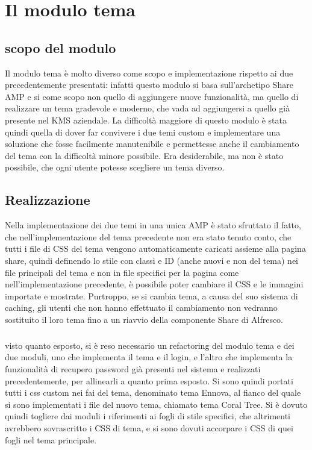 
\chapter{Il modulo tema}
\label{cap:modulo-tema}

\section{scopo del modulo}
Il modulo tema è molto diverso come scopo e implementazione rispetto ai due precedentemente presentati: infatti questo modulo si basa sull'archetipo Share AMP e si come scopo non quello di aggiungere nuove funzionalità, ma quello di realizzare un tema gradevole e moderno, che vada ad aggiungersi a quello già presente nel KMS aziendale. La difficoltà maggiore di questo modulo è stata quindi quella di dover far convivere i due temi custom e implementare una soluzione che fosse facilmente manutenibile e permettesse anche il cambiamento del tema con la difficoltà minore possibile.
Era desiderabile, ma non è stato possibile, che ogni utente potesse scegliere un tema diverso.
\section{Realizzazione}
Nella implementazione dei due temi in una unica AMP è stato sfruttato il fatto, che nell'implementazione del tema precedente non era stato tenuto conto, che tutti i file di CSS del tema vengono automaticamente caricati assieme alla pagina share, quindi definendo lo stile con classi e ID (anche nuovi e non del tema) nei file principali del tema e non in file specifici per la pagina come nell'implementazione precedente, è possibile poter cambiare il CSS e le immagini importate e mostrate.
Purtroppo, se si cambia tema, a causa del suo sistema di caching, gli utenti che non hanno effettuato il cambiamento non vedranno sostituito il loro tema fino a un riavvio della componente Share di Alfresco.
\paragraph{}visto quanto esposto, si è reso necessario un refactoring del modulo tema e dei due moduli, uno che implementa il tema e il login, e l'altro che implementa la funzionalità di recupero password già presenti nel sistema e realizzati precedentemente, per allinearli a quanto prima esposto. Si sono quindi portati tutti i css custom nei fai del tema, denominato tema Ennova, al fianco del quale si sono implementati i file del nuovo tema, chiamato tema Coral Tree. Si è dovuto quindi togliere dai moduli i riferimenti ai fogli di stile specifici, che altrimenti avrebbero sovrascritto i CSS di tema, e si sono dovuti accorpare i CSS di quei fogli nel tema principale.
